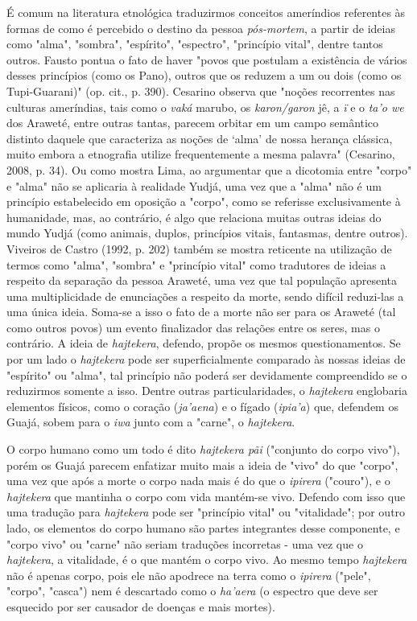 É comum na literatura etnológica traduzirmos conceitos ameríndios
referentes às formas de como é percebido o destino da pessoa
\emph{pós-mortem}, a partir de ideias como "alma", "sombra", "espírito",
"espectro", "princípio vital", dentre tantos outros. Fausto pontua o
fato de haver "povos que postulam a existência de vários desses
princípios (como os Pano), outros que os reduzem a um ou dois (como os
Tupi-Guarani)" (op. cit., p. 390). Cesarino observa que "noções
recorrentes nas culturas ameríndias, tais como o \emph{vaká} marubo, os
\emph{karon/garon} jê, a \emph{ï} e o \emph{ta'o we} dos Araweté, entre
outras tantas, parecem orbitar em um campo semântico distinto daquele
que caracteriza as noções de `alma' de nossa herança clássica, muito
embora a etnografia utilize frequentemente a mesma palavra" (Cesarino,
2008, p. 34). Ou como mostra Lima, ao argumentar que a dicotomia entre
"corpo" e "alma" não se aplicaria à realidade Yudjá, uma vez que a
"alma" não é um princípio estabelecido em oposição a "corpo", como se
referisse exclusivamente à humanidade, mas, ao contrário, é algo que
relaciona muitas outras ideias do mundo Yudjá (como animais, duplos,
princípios vitais, fantasmas, dentre outros). Viveiros de Castro (1992,
p. 202) também se mostra reticente na utilização de termos como "alma",
"sombra" e "princípio vital" como tradutores de ideias a respeito da
separação da pessoa Araweté, uma vez que tal população apresenta uma
multiplicidade de enunciações a respeito da morte, sendo difícil
reduzi-las a uma única ideia. Soma-se a isso o fato de a morte não ser
para os Araweté (tal como outros povos) um evento finalizador das
relações entre os seres, mas o contrário. A ideia de \emph{hajtekera},
defendo, propõe os mesmos questionamentos. Se por um lado o
\emph{hajtekera} pode ser superficialmente comparado às nossas ideias de
"espírito" ou "alma", tal princípio não poderá ser devidamente
compreendido se o reduzirmos somente a isso. Dentre outras
particularidades, o \emph{hajtekera} englobaria elementos físicos, como
o coração (\emph{ja'aena}) e o fígado (\emph{ipia'a}) que, defendem os
Guajá, sobem para o \emph{iwa} junto com a "carne", o \emph{hajtekera}.

O corpo humano como um todo é dito \emph{hajtekera pãi} ("conjunto do
corpo vivo"), porém os Guajá parecem enfatizar muito mais a ideia de
"vivo" do que "corpo", uma vez que após a morte o corpo nada mais é do
que o \emph{ipirera} ("couro"), e o \emph{hajtekera} que mantinha o
corpo com vida mantém-se vivo. Defendo com isso que uma tradução para
\emph{hajtekera} pode ser "princípio vital" ou "vitalidade"; por outro
lado, os elementos do corpo humano são partes integrantes desse
componente, e "corpo vivo" ou "carne" não seriam traduções incorretas -
uma vez que o \emph{hajtekera}, a vitalidade, é o que mantém o corpo
vivo. Ao mesmo tempo \emph{hajtekera} não é apenas corpo, pois ele não
apodrece na terra como o \emph{ipirera} ("pele", "corpo", "casca") nem é
descartado como o \emph{ha'aera} (o espectro que deve ser esquecido por
ser causador de doenças e mais mortes).

